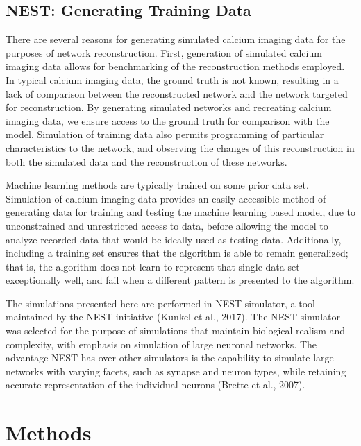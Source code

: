 \documentclass[11pt,titlepage]{article}
\begin{document}
\subsection{NEST: Generating Training Data}
There are several reasons for generating simulated calcium imaging data for the purposes of network reconstruction. First, generation of simulated calcium imaging data allows for benchmarking of the reconstruction methods employed. In typical calcium imaging data, the ground truth is not known, resulting in a lack of comparison between the reconstructed network and the network targeted for reconstruction. By generating simulated networks and recreating calcium imaging data, we ensure access to the ground truth for comparison with the model. Simulation of training data also permits programming of particular characteristics to the network, and observing the changes of this reconstruction in both the simulated data and the reconstruction of these networks.\par
Machine learning methods are typically trained on some prior data set. Simulation of calcium imaging data provides an easily accessible method of generating data for training and testing the machine learning based model, due to unconstrained and unrestricted access to data, before allowing the model to analyze recorded data that would be ideally used as testing data. Additionally, including a training set ensures that the algorithm is able to remain generalized; that is, the algorithm does not learn to represent that single data set exceptionally well, and fail when a different pattern is presented to the algorithm.\par
The simulations presented here are performed in NEST simulator, a tool maintained by the NEST initiative (Kunkel et al., 2017). The NEST simulator was selected for the purpose of simulations that maintain biological realism and complexity, with emphasis on simulation of large neuronal networks. The advantage NEST has over other simulators is the capability to simulate large networks with varying facets, such as synapse and neuron types, while retaining accurate representation of the individual neurons (Brette et al., 2007).\par
\newpage
\section{Methods}
\end{document}
